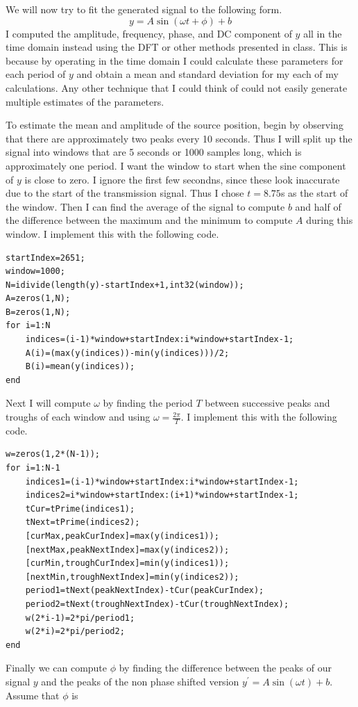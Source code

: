 \documentclass[12pt]{article}
\begin{document}
We will now try to fit the generated signal to the following form.
\[y=A\sin(\omega t + \phi) + b\]
I computed the amplitude, frequency, phase, and DC component of \(y\) all in the time domain instead using
the DFT or other methods presented in class. This is because by operating in the time domain
I could calculate these parameters for each period of \(y\) and obtain a mean and standard deviation
for my each of my calculations. Any other technique that I could think of could not easily generate multiple
estimates of the parameters.

To estimate the mean and amplitude of the source position, begin by observing that there
are approximately two peaks every 10 seconds. Thus I will split up the signal into windows
that are 5 seconds or 1000 samples long, which is approximately one period. I want the window
to start when the sine component of \(y\) is close to zero. I ignore the first few secondns, since
these look inaccurate due to the start of the transmission signal. Thus I chose \(t=8.75\)s
as the start of the window. Then I can find the average of the signal to compute \(b\) and half
of the difference between the maximum and the minimum to compute \(A\) during this window.
I implement this with the following code.
\begin{verbatim}
startIndex=2651;
window=1000;
N=idivide(length(y)-startIndex+1,int32(window));
A=zeros(1,N);
B=zeros(1,N);
for i=1:N
    indices=(i-1)*window+startIndex:i*window+startIndex-1;
    A(i)=(max(y(indices))-min(y(indices)))/2;
    B(i)=mean(y(indices));
end
\end{verbatim}
Next I will compute \(\omega\) by finding the period \(T\) between successive peaks and troughs of each
window and using \(\omega=\frac{2\pi}{T}\). I implement this with the following code.
\begin{verbatim}
w=zeros(1,2*(N-1));
for i=1:N-1
    indices1=(i-1)*window+startIndex:i*window+startIndex-1;
    indices2=i*window+startIndex:(i+1)*window+startIndex-1;
    tCur=tPrime(indices1);
    tNext=tPrime(indices2);
    [curMax,peakCurIndex]=max(y(indices1));
    [nextMax,peakNextIndex]=max(y(indices2));
    [curMin,troughCurIndex]=min(y(indices1));
    [nextMin,troughNextIndex]=min(y(indices2));
    period1=tNext(peakNextIndex)-tCur(peakCurIndex);
    period2=tNext(troughNextIndex)-tCur(troughNextIndex);
    w(2*i-1)=2*pi/period1;
    w(2*i)=2*pi/period2;
end
\end{verbatim}
Finally we can compute \(\phi\) by finding the difference between the peaks of our signal \(y\) and
the peaks of the non phase shifted version \(y^\prime=A\sin(\omega t)+b\). Assume that \(\phi\) is
\end{document}
